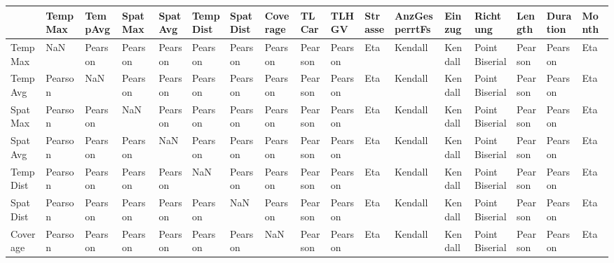\begin{tabular}{lllllllllllllllll}
\toprule
{} &         TempMax &         TempAvg &         SpatMax &         SpatAvg &        TempDist &        SpatDist &        Coverage &           TLCar &           TLHGV &     Strasse & AnzGesperrtFs &      Einzug &        Richtung &          Length &        Duration &       Month \\
\midrule
TempMax       &             NaN &         Pearson &         Pearson &         Pearson &         Pearson &         Pearson &         Pearson &         Pearson &         Pearson &         Eta &       Kendall &     Kendall &  Point Biserial &         Pearson &         Pearson &         Eta \\
TempAvg       &         Pearson &             NaN &         Pearson &         Pearson &         Pearson &         Pearson &         Pearson &         Pearson &         Pearson &         Eta &       Kendall &     Kendall &  Point Biserial &         Pearson &         Pearson &         Eta \\
SpatMax       &         Pearson &         Pearson &             NaN &         Pearson &         Pearson &         Pearson &         Pearson &         Pearson &         Pearson &         Eta &       Kendall &     Kendall &  Point Biserial &         Pearson &         Pearson &         Eta \\
SpatAvg       &         Pearson &         Pearson &         Pearson &             NaN &         Pearson &         Pearson &         Pearson &         Pearson &         Pearson &         Eta &       Kendall &     Kendall &  Point Biserial &         Pearson &         Pearson &         Eta \\
TempDist      &         Pearson &         Pearson &         Pearson &         Pearson &             NaN &         Pearson &         Pearson &         Pearson &         Pearson &         Eta &       Kendall &     Kendall &  Point Biserial &         Pearson &         Pearson &         Eta \\
SpatDist      &         Pearson &         Pearson &         Pearson &         Pearson &         Pearson &             NaN &         Pearson &         Pearson &         Pearson &         Eta &       Kendall &     Kendall &  Point Biserial &         Pearson &         Pearson &         Eta \\
Coverage      &         Pearson &         Pearson &         Pearson &         Pearson &         Pearson &         Pearson &             NaN &         Pearson &         Pearson &         Eta &       Kendall &     Kendall &  Point Biserial &         Pearson &         Pearson &         Eta \\

\end{tabular}
